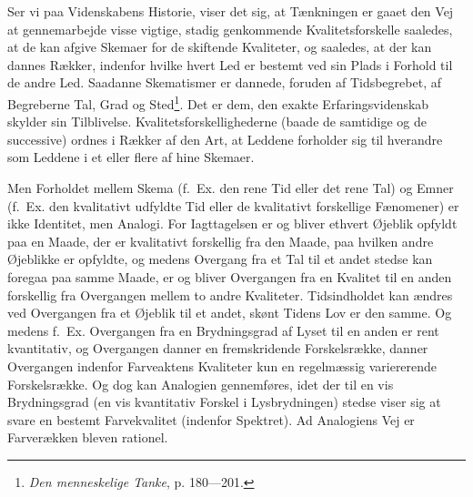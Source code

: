 \documentclass[12pt]{article}
\newcommand{\opage}[1]{\marginnote{\footnotesize\textit{[#1]}}}
\begin{document}
\setcounter{footnote}{0}%
\opage{44}Ser vi paa Videnskabens Historie, viser det sig, at Tænkningen er
gaaet den Vej at gennemarbejde visse vigtige, stadig genkommende
Kvalitetsforskelle saaledes, at de kan afgive Skemaer for de skiftende
Kvaliteter, og saaledes, at der kan dannes Rækker, indenfor hvilke hvert Led er
bestemt ved sin Plads i Forhold til de andre Led. Saadanne Skematismer er
dannede, foruden af Tidsbegrebet, af Begreberne Tal, Grad og
Sted\footnote{\textit{Den menneskelige Tanke}, p. 180---201.}. Det er dem, den
exakte Erfaringsvidenskab skylder sin Tilblivelse. Kvalitetsforskellighederne
(baade de samtidige og de successive) ordnes i Rækker af den Art, at Leddene
forholder sig til hverandre som Leddene i et eller flere af hine Skemaer.

Men Forholdet mellem Skema (f.~Ex. den rene Tid eller det rene Tal) og Emner
(f.~Ex. den kvalitativt udfyldte Tid eller de kvalitativt forskellige Fænomener)
er ikke Identitet, men Analogi. For Iagttagelsen er og bliver ethvert Øjeblik
opfyldt paa en Maade, der er kvalitativt forskellig fra den Maade, paa hvilken
andre Øjeblikke er opfyldte, og medens Overgang fra et Tal til et andet stedse
kan foregaa paa samme Maade, er og bliver Overgangen fra en Kvalitet til en
anden forskellig fra Overgangen mellem to andre Kvaliteter. Tidsindholdet kan
ændres ved Overgangen fra et Øjeblik til et andet, skønt Tidens Lov er den
samme. Og medens f.~Ex. Overgangen fra en Brydningsgrad af Lyset til en anden er
rent kvantitativ, og Overgangen danner en fremskridende Forskelsrække, danner
Overgangen
indenfor Farveaktens Kvaliteter kun en regelmæssig variererende Forskelsrække.
Og dog kan Analogien gennemføres, idet der til en vis Brydningsgrad (en vis
kvantitativ Forskel i Lysbrydningen) stedse viser sig at svare en bestemt
Farvekvalitet (indenfor Spektret). Ad Analogiens Vej er Farverækken bleven
rationel.
\end{document}
